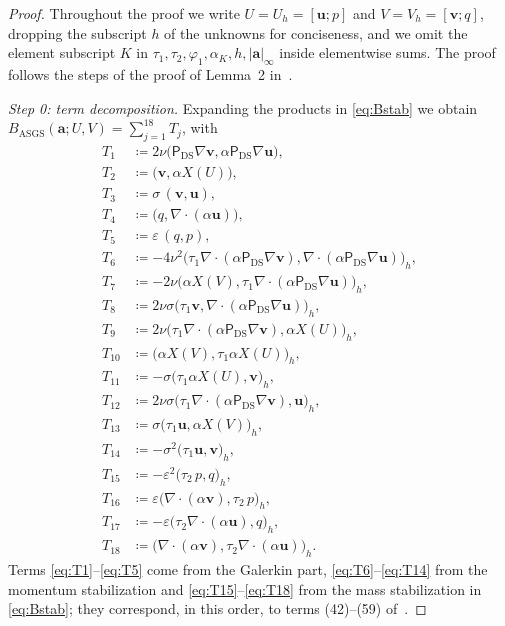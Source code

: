 \documentclass[11pt,a4paper]{article}
\newcommand{\bu}{\boldsymbol{u}}
\newcommand{\bv}{\boldsymbol{v}}
\newcommand{\ba}{\boldsymbol{a}}
\newcommand{\ViscProj}{\mathsf{P}_{\mathrm{DS}}}
\newcommand{\X}{X}
\theoremstyle{plain}
\theoremstyle{remark}
\theoremstyle{definition}
\numberwithin{equation}{section}
\begin{document}
\begin{proof}
Throughout the proof we write $U=U_h=[\bu;p]$ and $V=V_h=[\bv;q]$, dropping the subscript
$h$ of the unknowns for conciseness, and we omit the element subscript $K$ in
$\tau_1,\tau_2,\varphi_1,\alpha_K,h,|\ba|_\infty$ inside elementwise sums. The proof
follows the steps of the proof of Lemma~2 in~\cite{codina2001}.

\medskip\noindent\emph{Step 0: term decomposition.}
Expanding the products in \eqref{eq:Bstab} we obtain
$B_{\mathrm{ASGS}}(\ba;U,V) = \sum_{j=1}^{18} T_j$, with
\begin{align}
  T_1 &\coloneqq 2\nu\bigl(\ViscProj\nabla\bv,\alpha\ViscProj\nabla\bu\bigr), \label{eq:T1}\\
  T_2 &\coloneqq \bigl(\bv,\alpha\X(U)\bigr), \label{eq:T2}\\
  T_3 &\coloneqq \sigma\,(\bv,\bu), \label{eq:T3}\\
  T_4 &\coloneqq \bigl(q,\nabla\cdot(\alpha\bu)\bigr), \label{eq:T4}\\
  T_5 &\coloneqq \varepsilon\,(q,p), \label{eq:T5}\\
  T_6 &\coloneqq -4\nu^2\bigl(\tau_1\nabla\cdot(\alpha\ViscProj\nabla\bv),
        \nabla\cdot(\alpha\ViscProj\nabla\bu)\bigr)_h, \label{eq:T6}\\
  T_7 &\coloneqq -2\nu\bigl(\alpha\X(V),
        \tau_1\nabla\cdot(\alpha\ViscProj\nabla\bu)\bigr)_h, \label{eq:T7}\\
  T_8 &\coloneqq 2\nu\sigma\bigl(\tau_1\bv,
        \nabla\cdot(\alpha\ViscProj\nabla\bu)\bigr)_h, \label{eq:T8}\\
  T_9 &\coloneqq 2\nu\bigl(\tau_1\nabla\cdot(\alpha\ViscProj\nabla\bv),
        \alpha\X(U)\bigr)_h, \label{eq:T9}\\
  T_{10} &\coloneqq \bigl(\alpha\X(V),\tau_1\alpha\X(U)\bigr)_h, \label{eq:T10}\\
  T_{11} &\coloneqq -\sigma\bigl(\tau_1\alpha\X(U),\bv\bigr)_h, \label{eq:T11}\\
  T_{12} &\coloneqq 2\nu\sigma\bigl(\tau_1\nabla\cdot(\alpha\ViscProj\nabla\bv),
        \bu\bigr)_h, \label{eq:T12}\\
  T_{13} &\coloneqq \sigma\bigl(\tau_1\bu,\alpha\X(V)\bigr)_h, \label{eq:T13}\\
  T_{14} &\coloneqq -\sigma^2\bigl(\tau_1\bu,\bv\bigr)_h, \label{eq:T14}\\
  T_{15} &\coloneqq -\varepsilon^2\bigl(\tau_2\,p,q\bigr)_h, \label{eq:T15}\\
  T_{16} &\coloneqq \varepsilon\bigl(\nabla\cdot(\alpha\bv),\tau_2\,p\bigr)_h, \label{eq:T16}\\
  T_{17} &\coloneqq -\varepsilon\bigl(\tau_2\nabla\cdot(\alpha\bu),q\bigr)_h, \label{eq:T17}\\
  T_{18} &\coloneqq \bigl(\nabla\cdot(\alpha\bv),\tau_2\nabla\cdot(\alpha\bu)\bigr)_h .
        \label{eq:T18}
\end{align}
Terms \eqref{eq:T1}--\eqref{eq:T5} come from the Galerkin part,
\eqref{eq:T6}--\eqref{eq:T14} from the momentum stabilization and
\eqref{eq:T15}--\eqref{eq:T18} from the mass stabilization in \eqref{eq:Bstab}; they
correspond, in this order, to terms (42)--(59) of~\cite{codina2001}.


\end{proof}
\end{document}
